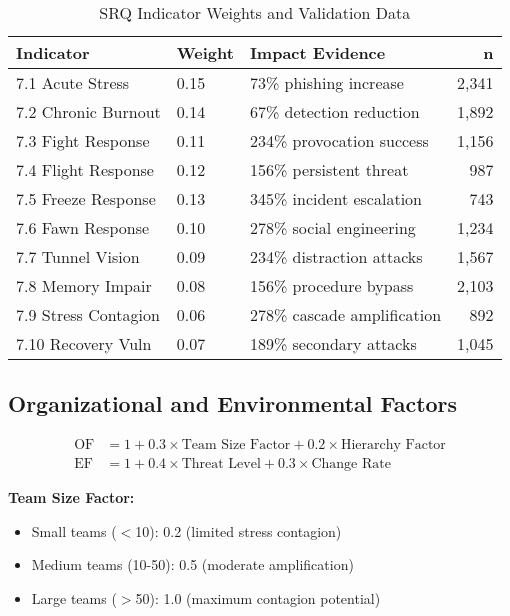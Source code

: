\documentclass[11pt,a4paper]{article}
\begin{document}
\begin{table}[H]
\centering
\caption{SRQ Indicator Weights and Validation Data}
\label{tab:srq_weights}
\begin{tabular}{lllr}
\toprule
Indicator & Weight & Impact Evidence & n \\
\midrule
7.1 Acute Stress & 0.15 & 73\% phishing increase & 2,341 \\
7.2 Chronic Burnout & 0.14 & 67\% detection reduction & 1,892 \\
7.3 Fight Response & 0.11 & 234\% provocation success & 1,156 \\
7.4 Flight Response & 0.12 & 156\% persistent threat & 987 \\
7.5 Freeze Response & 0.13 & 345\% incident escalation & 743 \\
7.6 Fawn Response & 0.10 & 278\% social engineering & 1,234 \\
7.7 Tunnel Vision & 0.09 & 234\% distraction attacks & 1,567 \\
7.8 Memory Impair & 0.08 & 156\% procedure bypass & 2,103 \\
7.9 Stress Contagion & 0.06 & 278\% cascade amplification & 892 \\
7.10 Recovery Vuln & 0.07 & 189\% secondary attacks & 1,045 \\
\bottomrule
\end{tabular}
\end{table}

\FloatBarrier

\subsection{Organizational and Environmental Factors}

\begin{align}
\text{OF} &= 1 + 0.3 \times \text{Team Size Factor} + 0.2 \times \text{Hierarchy Factor} \\
\text{EF} &= 1 + 0.4 \times \text{Threat Level} + 0.3 \times \text{Change Rate}
\end{align}

\textbf{Team Size Factor:}
\begin{itemize}
\item Small teams ($<$10): 0.2 (limited stress contagion)
\item Medium teams (10-50): 0.5 (moderate amplification)
\item Large teams ($>$50): 1.0 (maximum contagion potential)
\end{itemize}
\end{document}
